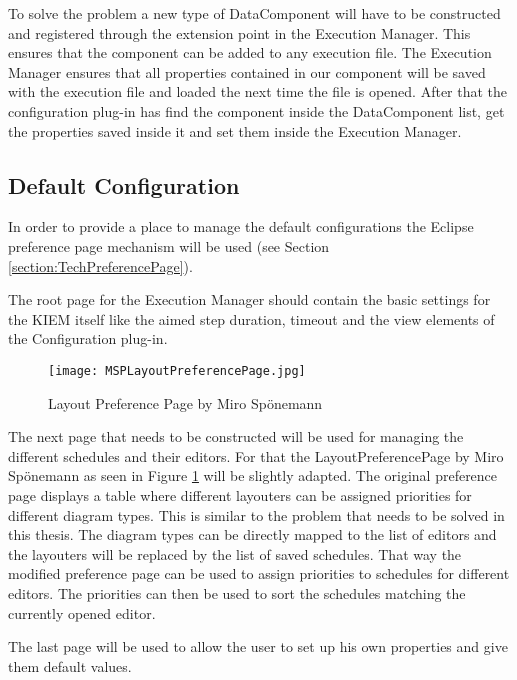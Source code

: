 To solve the problem a new type of DataComponent will have to be constructed and registered through
the extension point in the Execution Manager. This ensures that the component can be added to any execution
file. The Execution Manager  ensures that all properties contained in our component will be saved with
the execution file and loaded the next time the file is opened. After that the configuration plug-in has 
find the component inside the DataComponent list, get the properties saved inside it
and set them inside the Execution Manager.

\subsection{Default Configuration}
\label{section:ConfConceptsDefaultConf}
In order to provide a place to manage the default configurations the Eclipse preference page mechanism
will be used (see Section \ref{section:TechPreferencePage}).

The root page for the Execution Manager should contain the basic settings for the \ac{KIEM} itself like
the aimed step duration, timeout and the view elements of the Configuration plug-in.

\begin{figure}
  \centering
  \texttt{[image: MSPLayoutPreferencePage.jpg]}
  \caption[Layout Preference Page by Miro Sp\"onemann]%
  {Layout Preference Page by Miro Sp\"onemann\protect}
  \label{fig:MSPLayoutPreferencePage}
\end{figure}

The next page that needs to be constructed will be used for managing the different schedules
and their editors. For that the LayoutPreferencePage by Miro Sp\"onemann
as seen in Figure \ref{fig:MSPLayoutPreferencePage} will be slightly adapted. The original preference page
displays a table where different layouters can be assigned priorities for different diagram
types. This is similar to the problem that needs to be solved in this thesis. The diagram types
can be directly mapped to the list of editors and the layouters will be replaced by the list of saved schedules.
That way the modified preference page can be used to assign priorities to schedules for
different editors. The priorities can then be used to sort the schedules matching
the currently opened editor.

The last page will be used to allow the user to set up his own properties and give them
default values.

